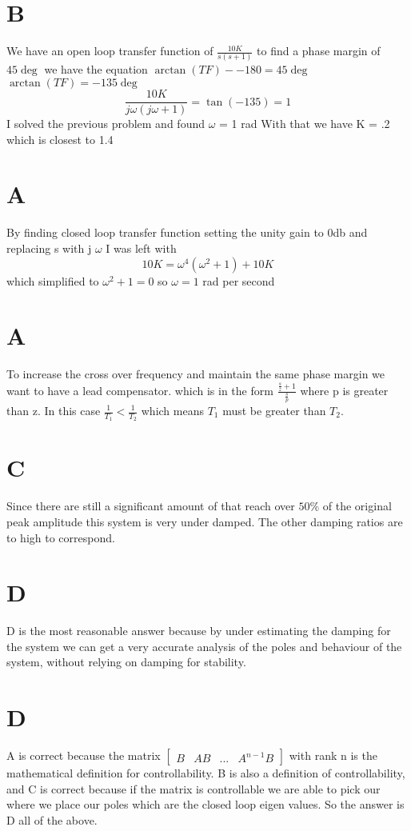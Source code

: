 \documentclass[11pt,english]{article}
\begin{document}
\section{B} 
We have an open loop transfer function of 
$\frac{10K}{s(s +1)} $ 
to find a phase margin of $45\deg $ we have the equation 
$\arctan(TF) - -180 = 45\deg$ 
$\arctan(TF) = -135\deg$ 
$$ \frac{10K}{j\omega(j\omega+1)} = \tan(-135) = 1 $$
I solved the previous problem and found $\omega$ = 1 rad 
With that we have K = .2 which is closest to 1.4
\section{A} 
By finding closed loop transfer function setting the unity gain to 0db and replacing s with j $\omega$ I was left with 
$$ 10K = \omega^4 ( \omega^2 +1) + 10K $$
which simplified to  
$\omega^2 +1 = 0 $ 
so $\omega = 1$ rad per second 
\section{A} 
To increase the cross over frequency and maintain the same phase margin we want to have a lead compensator.  which is in the form  $\frac{\frac{s}{z} +1}{\frac{s}{p}} $ where p is greater than z. In this case  $\frac{1}{T_1} < \frac{1}{T_2}$ which means $T_1$ must be greater than $T_2$. 

\section{C}
Since there are still a significant amount of  that reach over $50 \% $ of the original peak amplitude this system is very under damped. The other damping ratios are to high to correspond. 
\section{D}
D is the most reasonable answer because by under estimating the damping for the system we can get a very accurate analysis of the poles and behaviour of the system, without relying on damping for stability. 
 \section{D} 
 A is correct because  the matrix $\begin{bmatrix}
 B & AB & ... & A^{n-1}B
 \end{bmatrix}$ with rank n  is the mathematical definition for controllability.
 B is also a definition of controllability, and C is correct because if the matrix is controllable we are able to pick our where we place our poles which are the closed loop eigen values. So the answer is D all of the above.   
 
\end{document}
